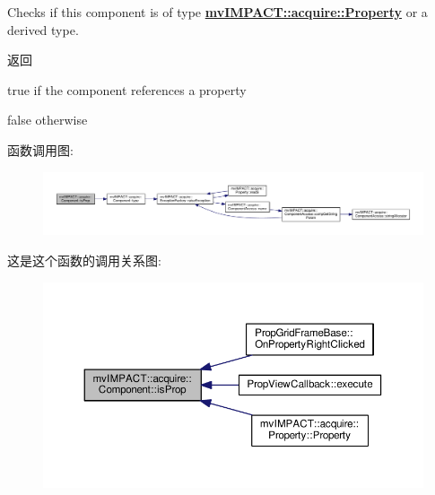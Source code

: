 Checks if this component is of type {\bfseries \hyperlink{classmv_i_m_p_a_c_t_1_1acquire_1_1_property}{mv\+I\+M\+P\+A\+C\+T\+::acquire\+::\+Property}} or a derived type. 

\begin{DoxyReturn}{返回}

\begin{DoxyItemize}
\item true if the component references a property
\item false otherwise 
\end{DoxyItemize}
\end{DoxyReturn}


函数调用图\+:
\nopagebreak
\begin{figure}[H]
\begin{center}
\leavevmode
\includegraphics[width=350pt]{classmv_i_m_p_a_c_t_1_1acquire_1_1_component_aed95ea2f827d0fd457d03857516e0b68_cgraph}
\end{center}
\end{figure}




这是这个函数的调用关系图\+:
\nopagebreak
\begin{figure}[H]
\begin{center}
\leavevmode
\includegraphics[width=350pt]{classmv_i_m_p_a_c_t_1_1acquire_1_1_component_aed95ea2f827d0fd457d03857516e0b68_icgraph}
\end{center}
\end{figure}


